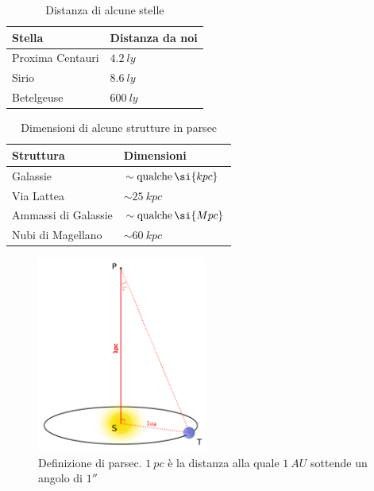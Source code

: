 \begin{table}
\caption{Distanza di alcune stelle}
\label{tab:distanze-stelle}
\centering
\begin{tabular}{ll}
\toprule
Stella & Distanza da noi  \\
\midrule
Proxima Centauri & $\SI{4.2}{ly}$ \\
Sirio            & $\SI{8.6}{ly}$ \\
Betelgeuse       & $\SI{600}{ly}$ \\
\bottomrule
\end{tabular}
\end{table}

\begin{table}
\caption{Dimensioni di alcune strutture in parsec}
\label{tab:distanze-parsec}
\centering
\begin{tabular}{ll}
\toprule
Struttura & Dimensioni \\
\midrule
Galassie          & $\sim \textup{qualche} \, \si{kpc}$ \\
Via Lattea           & $\sim \SI{25}{kpc}$    \\
Ammassi di Galassie            & $\sim \textup{qualche} \, \si{Mpc}$  \\
Nubi di Magellano & $\sim \SI{60}{kpc}$  \\

\bottomrule
\end{tabular}
\end{table}

\begin{figure}
\centering
\includegraphics[width=0.5\textwidth]{immagini/parsec.png}
\caption{Definizione di parsec. $\SI{1}{pc}$ è la distanza alla quale $\SI{1}{AU}$ sottende un angolo di $\ang{;;1}$}
\label{fig:parsec}
\end{figure}

